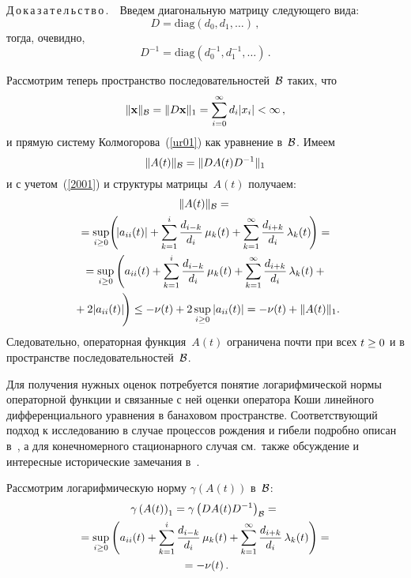 \begin{multicols}{2}
\medskip

\noindent
Д\,о\,к\,а\,з\,а\,т\,е\,л\,ь\,с\,т\,в\,о\,.\ \
Введем диагональную матрицу следующего вида:
\begin{equation*}
D= \mathrm{diag} \left(d_0, d_1, \dots \right) \,, 
\end{equation*}
тогда, очевидно,
\begin{equation*}
D^{-1}= \mathrm{diag} \left(d_0^{-1}, d_1^{-1}, \dots \right)\,.  
\end{equation*}

Рассмотрим теперь пространство последовательностей~$\cal B$ 
таких, что 
$$
\|{\bf x}\|_{\cal B} \hm= \|D{\bf x}\|_{1} \hm= \sum\limits_{i=0}^{\infty} d_i
|x_i| \hm< \infty\,,
$$
и прямую систему Колмогорова~(\ref{ur01}) как
уравнение в~$\cal B$. Имеем 
$$
\|A(t)\|_{\cal B} \hm= \|DA(t)D^{-1}\|_{1}
$$ 
и с учетом~(\ref{2001}) и структуры матрицы~$A(t)$ получаем:
\begin{multline*}
\|A(t)\|_{\cal B} ={}\\
{}= \sup\limits_{i \ge 0} \!\left(\! |a_{ii}(t)| +
\sum\limits_{k=1}^{i}\fr{d_{i-k}}{d_i}\,\mu_k(t) + 
\sum\limits_{k=1}^{\infty} \fr{d_{i+k}}{d_i}\,\la_{k}(t)
 \!\right) = {}\\
 {}
= \sup\limits_{i \ge 0} \left( a_{ii}(t) +
\sum\limits_{k=1}^{i}\fr{d_{i-k}}{d_i}\,\mu_k(t) + \sum\limits_{k=1}^{\infty} 
\fr{d_{i+k}}{d_i}\,\la_{k}(t) +{}\right.\\
\hspace*{-6pt}\left.{}+ 2|a_{ii}(t)|
\vphantom{\sum\limits_{k=1}^\infty}\! \right) 
 \le -\nu(t) + 2 \sup\limits_{i \ge 0} \left| a_{ii}(t) \right| = 
 -\nu(t)+\|A(t)\|_{1}.\hspace*{-7.18808pt}
\end{multline*}
Следовательно, операторная функция~$A(t)$ ограничена почти при всех $t \hm\ge 0$ и в пространстве
последовательностей~$\cal B$.

Для получения нужных оценок потребуется понятие логарифмической
нормы операторной функции и связанные с ней оценки оператора Коши
линейного дифференциального уравнения в банаховом пространстве.
Соответствующий подход к исследованию в случае процессов рождения и
гибели подробно описан в~\cite{z95, z08b}, а для конечномерного
стационарного случая см.\ также обсуждение и интересные исторические
замечания в~\cite{dzp}.

Рассмотрим логарифмическую норму
$\gamma \left(A(t)\right)$ в~$\cal B$:
\begin{multline*}
\gamma \left(A(t)\right)_{1} = 
\gamma \left(DA(t)D^{-1}\right)_{\cal B} = {} \\ 
{}=  \sup\limits_{i \ge 0} \left( a_{ii}(t) +\sum\limits_{k=1}^{i}\displaystyle\frac{\displaystyle d_{i-k}\mathstrut}{\displaystyle d_i\mathstrut}\,\mu_k(t) 
+ \sum\limits_{k=1}^{\infty} \displaystyle\frac{\displaystyle d_{i+k}\mathstrut}{\displaystyle d_i\mathstrut}\,\lambda_{k}(t)  \right) ={}\\
{}= - \nu (t)\,. 
\end{multline*}


\end{multicols}
